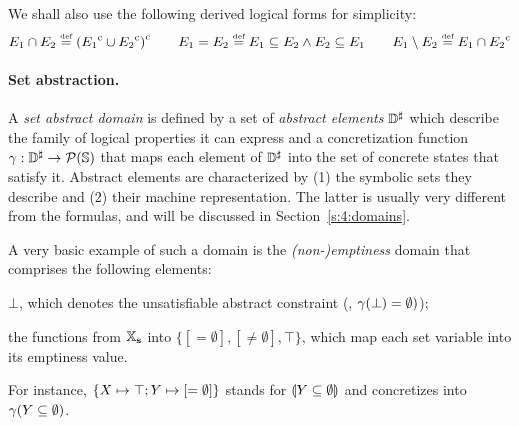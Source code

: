 We shall also use the following derived logical forms for simplicity:
\[
E_1 \cap E_2 \stackrel{\textrm{\tiny def}}{=} {({E_1}^{\mathrm{c}} \cup {E_2}^{\mathrm{c}})}^{\mathrm{c}}
\qquad
E_1 = E_2 \stackrel{\textrm{\tiny def}}{=} E_1 \subseteq E_2 \wedge E_2 \subseteq E_1
\qquad
E_1 \setminus E_2 \stackrel{\textrm{\tiny def}}{=} E_1 \cap {E_2}^{\mathrm{c}}
\]

\paragraph{Set abstraction.}
A {\em set abstract domain} is defined by a set of {\em abstract elements}
\( {\mathbb{D}}^{\sharp} \) which describe the family of logical properties it can
express and a concretization function \( \gamma: {\mathbb{D}}^{\sharp} \rightarrow
\mathcal{P}(\mathbb{S}) \) that maps each element of \( {\mathbb{D}}^{\sharp} \) into the set
of concrete states that satisfy it.
Abstract elements are characterized by
(1) the symbolic sets they describe and
(2) their machine representation.
The latter is usually very different from the formulas, and will be
discussed in Section~\ref{s:4:domains}.
\begin{example}
  \label{ex:1:mt}
  A very basic example of such a domain is the {\em (non-)emptiness} domain
  that comprises the following elements:
  \begin{compactitem}
  \item \( \bot \), which denotes the unsatisfiable abstract constraint
    (\ie, \( \gamma( \bot ) = \emptyset ) \));
  \item the functions from \( \mathbb{X}_{\bf s} \) into \( \{ [=\emptyset],
    [\not=\emptyset], \top \} \), which map each set variable into
    its emptiness value.
  \end{compactitem}
  For instance, \( \{ X \mapsto \top; Y \mapsto [=\emptyset] \} \)
  stands for \( \llparenthesis Y \subseteq \emptyset \rrparenthesis \) and concretizes into
  \( \gamma( Y \subseteq \emptyset ) \).
\end{example}

